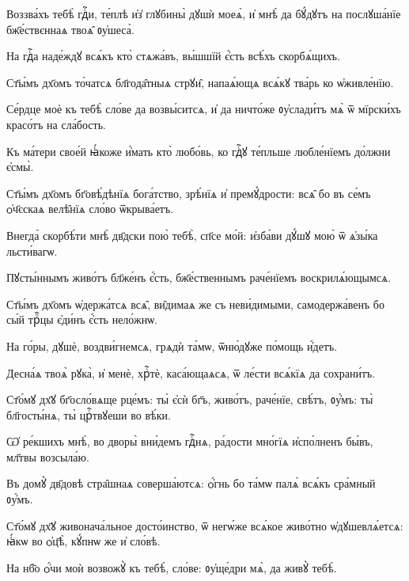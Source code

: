 \hKv Воззва́хъ тебѣ̀ гдⷭ҇и, те́плѣ и҆з̾  глꙋбины̀  дꙋшѝ моеѧ̀, и҆  мнѣ̀ да бꙋ́дꙋтъ на послꙋша́нїе бж҃е́ствєннаѧ твоѧ̑  ᲂу҆шеса̀. 

\hKv На гдⷭ҇а наде́ждꙋ всѧ́къ кто̀ стѧжа́въ, вы́шшїй є҆́сть  всѣ́хъ скорбѧ́щихъ. 
%

\hKv Ст҃ы́мъ дх҃омъ то́чатсѧ бл҃года̑тныѧ стрꙋи̑,  напаѧ́ющѧ всѧ́кꙋ тва́рь ко ѡ҆живле́нїю. 
%

\hKv Се́рдце моѐ къ тебѣ̀ сло́ве да возвы́ситсѧ, и҆ да ничто́же  ᲂу҆слади́тъ мѧ̀ ѿ мїрски́хъ красо́тъ на сла́бость. 

\hKv Къ ма́тери свое́й ꙗ҆́коже и҆́мать кто̀ любо́вь, ко гдⷭ҇ꙋ  те́пльше любле́нїемъ до́лжни є҆смы̀. 
%

\hKv Ст҃ы́мъ дх҃омъ бг҃овѣ́дѣнїѧ бога́тство, зрѣ́нїѧ  и҆ премꙋ́дрости: всѧ̑ бо въ се́мъ ѻ҆ч҃єскаѧ велѣ̑нїѧ  сло́во ѿкрыва́етъ. 
%

\hKv Внегда̀ скорбѣ́ти мнѣ̀ дв҃дски пою̀ тебѣ̀, сп҃се мо́й:  и҆зба́ви дꙋ́шꙋ мою̀ ѿ ѧ҆зы́ка льсти́вагѡ. 

\hKv Пꙋсты́ннымъ живо́тъ бл҃же́нъ є҆́сть, бж҃е́ственнымъ  раче́нїемъ воскрилѧ́ющымсѧ. 
%

\hKv Ст҃ы́мъ дх҃омъ ѡ҆держа́тсѧ всѧ̑, ви̑димаѧ же съ  неви́димыми, самодержа́венъ бо сы́й трⷪ҇цы є҆ди́нъ є҆́сть  нело́жнѡ. 
%

\hKv На го́ры, дꙋшѐ, воздви́гнемсѧ, грѧдѝ та́мѡ,  ѿню́дꙋже по́мощь и҆́детъ. 

\hKv Десна́ѧ твоѧ̀ рꙋка̀, и҆ менѐ, хрⷭ҇тѐ, каса́ющаѧсѧ, ѿ  ле́сти всѧ́кїѧ да сохрани́тъ. 
%

\hKv Ст҃о́мꙋ дх҃ꙋ бг҃осло́вѧще рце́мъ: ты̀ є҆сѝ бг҃ъ,  живо́тъ, раче́нїе, свѣ́тъ, ᲂу҆́мъ: ты̀ бл҃госты́нѧ, ты̀  црⷭ҇твꙋеши во вѣ́ки. 
%

\hKv Ѡ҆ ре́кшихъ мнѣ̀, во дворы̀ вни́демъ гдⷭ҇нѧ, ра́дости  мно́гїѧ и҆спо́лненъ бы́въ, мл҃твы возсыла́ю. 

\hKv Въ домꙋ̀ дв҃довѣ стра̑шнаѧ соверша́ютсѧ: ѻ҆́гнь бо та́мѡ  палѧ̀ всѧ́къ сра́мный ᲂу҆́мъ. 
%

\hKv Ст҃о́мꙋ дх҃ꙋ живонача́льное досто́инство, ѿ  негѡ́же всѧ́кое живо́тно ѡ҆дꙋшевлѧ́етсѧ: ꙗ҆́кѡ во ѻ҆ц҃ѣ̀,  кꙋ́пнѡ же и҆ сло́вѣ. 
%

\hKv На нб҃о ѻ҆́чи моѝ возвожꙋ̀ къ тебѣ̀, сло́ве: ᲂу҆ще́дри  мѧ̀, да живꙋ̀ тебѣ̀. 

